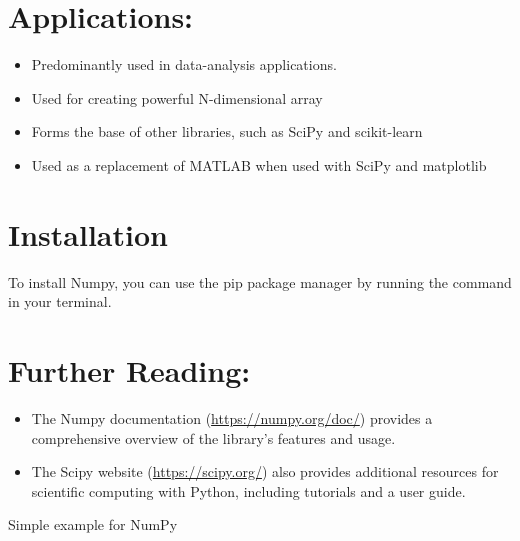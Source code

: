 \section{Applications:}

\begin{itemize}
    \item Predominantly used in data-analysis applications.
    \item Used for creating powerful N-dimensional array
    \item Forms the base of other libraries, such as SciPy and scikit-learn
    \item Used as a replacement of MATLAB when used with SciPy and matplotlib
\end{itemize}


\section{Installation}

To install Numpy, you can use the pip package manager by running the command  in your terminal.




\section{Further Reading:}

\begin{itemize}
    \item The Numpy documentation (\url{https://numpy.org/doc/}) provides a comprehensive overview of the library's features and usage.
    \item The Scipy website (\url{https://scipy.org/}) also provides additional resources for scientific computing with Python, including tutorials and a user guide.
\end{itemize}


\begin{code}
    
    
    \caption{Simple example for NumPy}
\end{code}   


